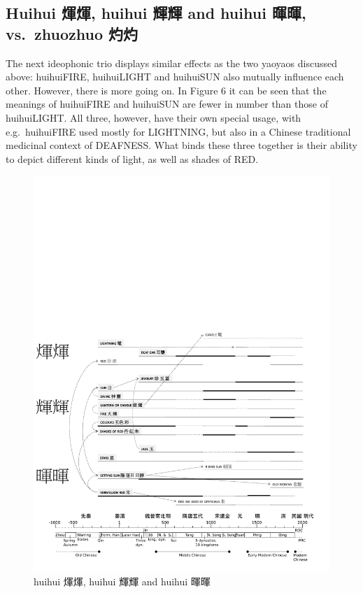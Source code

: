 \documentclass[12pt,article,oneside]{memoir}
\theoremstyle{definition}
\theoremstyle{definition}
\theoremstyle{definition}
\theoremstyle{remark}
\begin{document}
\subsection{Huihui 煇煇, huihui 輝輝 and huihui 暉暉, vs.~zhuozhuo
灼灼}\label{huihui--huihui--and-huihui--vs.zhuozhuo-}

The next ideophonic trio displays similar effects as the two yaoyaos
discussed above: huihuiFIRE, huihuiLIGHT and huihuiSUN also mutually
influence each other. However, there is more going on. In Figure 6 it
can be seen that the meanings of huihuiFIRE and huihuiSUN are fewer in
number than those of huihuiLIGHT. All three, however, have their own
special usage, with e.g.~huihuiFIRE used mostly for LIGHTNING, but also
in a Chinese traditional medicinal context of DEAFNESS. What binds these
three together is their ability to depict different kinds of light, as
well as shades of RED.

\begin{figure}
\centering
\includegraphics{ideos/huihui.pdf}
\caption{\label{fig:huihui}huihui 煇煇, huihui 輝輝 and huihui 暉暉}
\end{figure}
\end{document}
